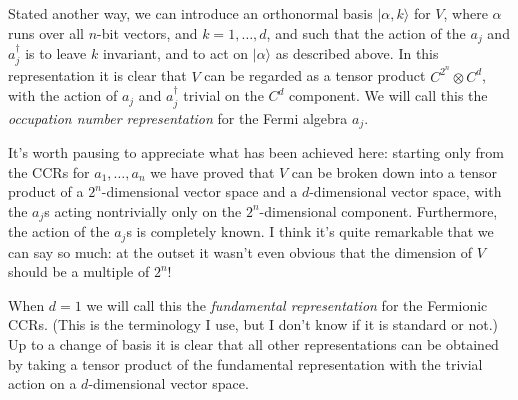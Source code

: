 \documentclass[12pt]{article}
\begin{document}
{Stated another way, we can introduce an orthonormal basis
$|\alpha,k\rangle$ for $V$, where $\alpha$ runs over all $n$-bit
vectors, and $k = 1,\ldots,d$, and such that the action of the $a_j$
and $a_j^\dagger$ is to leave $k$ invariant, and to act on
$|\alpha\rangle$ as described above.  In this representation it is
clear that $V$ can be regarded as a tensor product $C^{2^n} \otimes
C^d$, with the action of $a_j$ and $a_j^\dagger$ trivial on the $C^d$
component.  We will call this the \emph{occupation number
  representation} for the Fermi algebra $a_j$.

It's worth pausing to appreciate what has been achieved here: starting
only from the CCRs for $a_1,\ldots,a_n$ we have proved that $V$ can be
broken down into a tensor product of a $2^n$-dimensional vector space
and a $d$-dimensional vector space, with the $a_j$s acting
nontrivially only on the $2^n$-dimensional component. Furthermore, the
action of the $a_j$s is completely known.  I think it's quite
remarkable that we can say so much: at the outset it wasn't even
obvious that the dimension of $V$ should be a multiple of $2^n$!

When $d=1$ we will call this the \emph{fundamental representation} for
the Fermionic CCRs.  (This is the terminology I use, but I don't know
if it is standard or not.)  Up to a change of basis it is clear that
all other representations can be obtained by taking a tensor product
of the fundamental representation with the trivial action on a
$d$-dimensional vector space.




}
\end{document}

